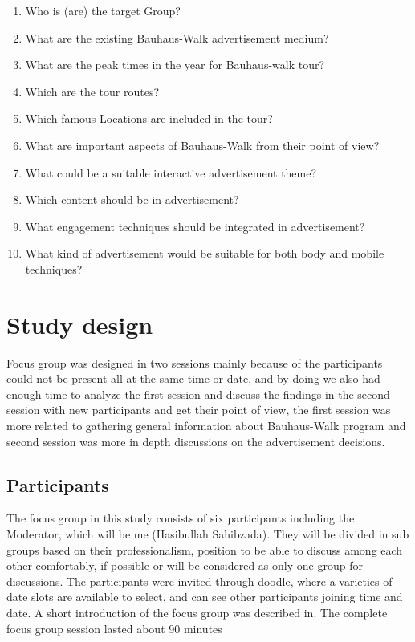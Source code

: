 \begin{enumerate}
\item Who is (are) the target Group?
\item What are the existing Bauhaus-Walk advertisement medium?
\item What are the peak times in the year for Bauhaus-walk tour?
\item Which are the tour routes?
\item Which famous Locations are included in the tour?
\item What are important aspects of Bauhaus-Walk from their point of view?
\item What could be a suitable interactive advertisement theme?
\item Which content should be in advertisement?
\item What engagement techniques should be integrated in advertisement?
\item What kind of advertisement would be suitable for both body and mobile techniques?
\end{enumerate}

\section{Study design}
Focus group was designed in two sessions mainly because of the participants could not be present all at the same time or date, and by doing we also had enough time to analyze the first session and discuss the findings in the second session with new participants and get their point of view, the first session was more related to gathering general information about Bauhaus-Walk program and second session was more in depth discussions on the advertisement decisions. 

\subsection{Participants}
The focus group in this study consists of six participants including the Moderator, which will be me (Hasibullah Sahibzada). They will be divided in sub groups based on their professionalism, position to be able to discuss among each other comfortably, if possible or will be considered as only one group for discussions.
The participants were invited through doodle, where a varieties of date slots are available to select, and can see other participants joining time and date. A short introduction of the focus group was described in. The complete focus group session lasted about 90 minutes

